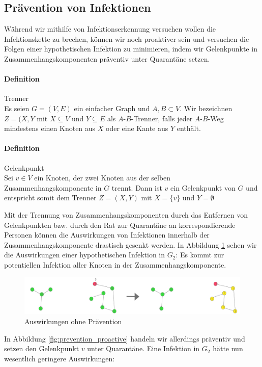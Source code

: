 \documentclass[12pt]{article}
\begin{document}
\subsection{Prävention von Infektionen}
Während wir mithilfe von Infektionserkennung versuchen wollen die Infektionskette zu brechen, können wir noch proaktiver sein und versuchen die Folgen einer hypothetischen Infektion zu minimieren, indem wir Gelenkpunkte in Zusammenhangskomponenten präventiv unter Quarantäne setzen. 

\paragraph{Definition} Trenner
\\
Es seien $G=(V,E)$ ein einfacher Graph und $A,B \subset V$. Wir bezeichnen $Z=(X,Y$ mit $X \subseteq V$ und $Y \subseteq E$ als $A$-$B$-Trenner, falls jeder $A$-$B$-Weg mindestens einen Knoten aus $X$ oder eine Kante aus $Y$ enthält. 

\paragraph{Definition} Gelenkpunkt
\\
Sei $v \in V$ ein Knoten, der zwei Knoten aus der selben Zusammenhangskomponente in $G$ trennt. Dann ist $v$ ein Gelenkpunkt von $G$ und entspricht somit dem Trenner $Z=(X,Y)$ mit $X = \{v\}$ und $Y = \emptyset$

Mit der Trennung von Zusammenhangskomponenten durch das Entfernen von Gelenkpunkten bzw. durch den Rat zur Quarantäne an korrespondierende Personen können die Auswirkungen von Infektionen innerhalb der Zusammenhangskomponente drastisch gesenkt werden. In Abbildung \ref{fig:prevention_normal} sehen wir die Auswirkungen einer hypothetischen Infektion in $G_2$: Es kommt zur potentiellen Infektion aller Knoten in der Zusammenhangskomponente.

\begin{figure}[h]
    \centering
    \includegraphics[width=\textwidth]{res/prevention_normal}
    \caption{Auswirkungen ohne Prävention}
    \label{fig:prevention_normal}
\end{figure}

In Abbildung \ref{fig:prevention_proactive} handeln wir allerdings präventiv und setzen den Gelenkpunkt $v$ unter Quarantäne. Eine Infektion in $G_2$ hätte nun wesentlich geringere Auswirkungen:
\end{document}
